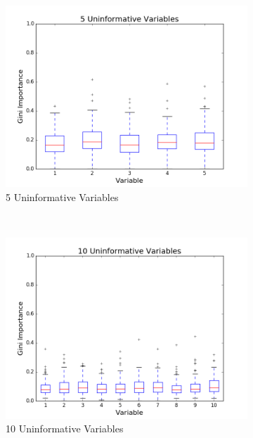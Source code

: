 \begin{figure}[H]
  \centering
  \begin{subfigure}[b]{0.45\textwidth}
    \includegraphics[width=\textwidth]{figures/random_forests/rf_variable_count_bias_5.png}
    \caption{5 Uninformative Variables}
    \label{fig:var-count-5}
  \end{subfigure}
  ~
  \begin{subfigure}[b]{0.45\textwidth}
    \includegraphics[width=\textwidth]{figures/random_forests/rf_variable_count_bias_10.png}
    \caption{10 Uninformative Variables}
    \label{fig:var-count-10}
  \end{subfigure}
  ~
  \begin{subfigure}[b]{0.45\textwidth}

\end{subfigure}
\end{figure}
